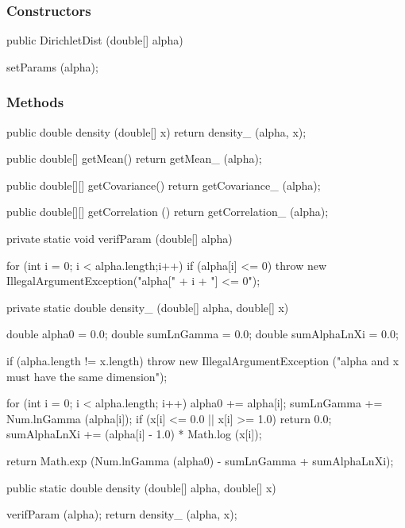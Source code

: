 \subsubsection* {Constructors}

\begin{code}

   public DirichletDist (double[] alpha) \begin{hide} {
      setParams (alpha);
   }\end{hide}
\end{code}

\subsubsection* {Methods}

\begin{code}\begin{hide}

   public double density (double[] x) {
      return density_ (alpha, x);
   }

   public double[] getMean() {
      return getMean_ (alpha);
   }

   public double[][] getCovariance() {
      return getCovariance_ (alpha);
   }

   public double[][] getCorrelation () {
      return getCorrelation_ (alpha);
   }

   private static void verifParam (double[] alpha) {

      for (int i = 0; i < alpha.length;i++)
      {
         if (alpha[i] <= 0)
            throw new IllegalArgumentException("alpha[" + i + "] <= 0");
      }
   }

   private static double density_ (double[] alpha, double[] x) {
      double alpha0 = 0.0;
      double sumLnGamma = 0.0;
      double sumAlphaLnXi = 0.0;

      if (alpha.length != x.length)
         throw new IllegalArgumentException ("alpha and x must have the same dimension");

      for (int i = 0; i < alpha.length; i++) {
         alpha0 += alpha[i];
         sumLnGamma += Num.lnGamma (alpha[i]);
         if (x[i] <= 0.0 || x[i] >= 1.0)
            return 0.0;
         sumAlphaLnXi += (alpha[i] - 1.0) * Math.log (x[i]);
      }

      return Math.exp (Num.lnGamma (alpha0) - sumLnGamma + sumAlphaLnXi);
   }\end{hide}

   public static double density (double[] alpha, double[] x)\begin{hide} {
      verifParam (alpha);
      return density_ (alpha, x);
   }\end{hide}
\end{code}
